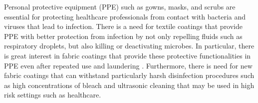 \documentclass[journal=jacsat,manuscript=article]{achemso}
\begin{document}
Personal protective equipment (PPE) such as  gowns,  masks, and scrubs are essential for protecting healthcare professionals from contact with bacteria and viruses that lead to infection.
There is a need for textile coatings that provide PPE with better protection from infection 
by not only repelling fluids such as 
respiratory droplets, but 
also killing or deactivating microbes. In particular, there is great interest in fabric coatings that provide these protective functionalities in PPE even after repeated use and laundering \cite{Kraay:18,galante:2020,galante:2022}.
Furthermore, there is need for new fabric coatings that can withstand particularly harsh disinfection procedures such as high concentrations of bleach and ultrasonic cleaning that may be used in high%
risk settings such as healthcare.  


\end{document}
